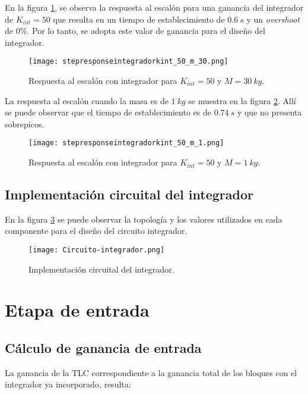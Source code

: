 \noindent En la figura \ref{fig:respuesta-al-escalon-con-k-50-M-30}, se observa la respuesta al escal\'{o}n para una ganancia del integrador de $K_{int}=50$ que resulta en un tiempo de establecimiento de $0.6\:s$ y un \textsl{overshoot} de 0\%. Por lo tanto, se adopta este valor de ganancia para el dise\~{n}o del integrador.

\begin{figure}[H]
	\centering
	\texttt{[image: stepresponseintegradorkint\_50\_m\_30.png]}
	\caption{Respuesta al escalón con integrador para $K_{int}=50$ y $M = 30\:kg$.}
	\label{fig:respuesta-al-escalon-con-k-50-M-30}
\end{figure}

\noindent La respuesta al escal\'{o}n cuando la masa es de $1 \:kg$ se muestra en la figura \ref{fig:respuesta-al-escalon-con-k-50-M-1}. All\'{i} se puede observar que el tiempo de establecimiento es de $0.74\:s$ y que no presenta sobrepicos.

\begin{figure}[H]
	\centering
	\texttt{[image: stepresponseintegradorkint\_50\_m\_1.png]}
	\caption{Respuesta al escalón con integrador para $K_{int} =50$ y $M = 1 \:kg$.}
	\label{fig:respuesta-al-escalon-con-k-50-M-1}
\end{figure}



\subsection{Implementación circuital del integrador}

\noindent En la figura \ref{fig:circuito-integrador} se puede observar la topología y los valores utilizados en cada componente para el diseño del circuito integrador. 

\begin{figure}[H]
	\centering
	\texttt{[image: Circuito-integrador.png]}
	\caption{Implementación circuital del integrador.}
	\label{fig:circuito-integrador}
	\end{figure}
\section{Etapa de entrada}
\subsection{Cálculo de ganancia de entrada}

\noindent La ganancia de la TLC correspondiente a la ganancia total de los bloques con el integrador ya incorporado, resulta:

